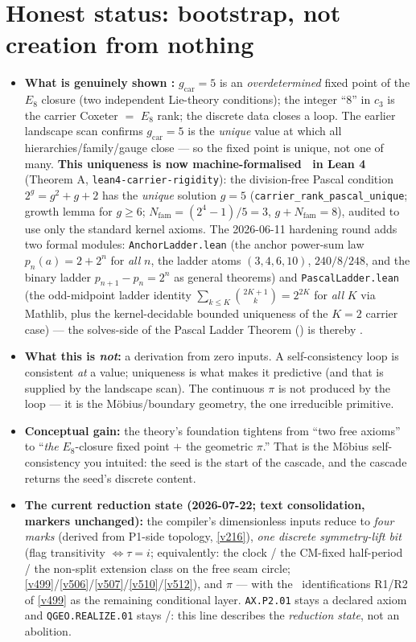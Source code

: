 \documentclass[11pt,a4paper]{article}
\newcommand{\gcar}{g_{\mathrm{car}}}
\newcommand{\Nfam}{N_{\mathrm{fam}}}
\newcommand{\cthree}{c_3}
\theoremstyle{definition}
\begin{document}
\section{Honest status: bootstrap, not creation from nothing}
\begin{itemize}[leftmargin=1.4em]
\item \textbf{What is genuinely shown \mE:} $\gcar=5$ is an \emph{overdetermined} fixed point of the
  $E_8$ closure (two independent Lie-theory conditions); the integer ``$8$'' in $\cthree$ is the carrier
  Coxeter $=$ $E_8$ rank; the discrete data closes a loop. The earlier landscape scan confirms
  $\gcar=5$ is the \emph{unique} value at which all hierarchies/family/gauge close --- so the fixed point
  is unique, not one of many. \textbf{This uniqueness is now machine-formalised \mE\ in Lean 4} (Theorem A,
  \texttt{lean4-carrier-rigidity}): the division-free Pascal condition $2^{g}=g^2+g+2$ has the \emph{unique}
  solution $g=5$ (\texttt{carrier\_rank\_pascal\_unique}; growth lemma for $g\ge6$; $\Nfam=(2^{4}{-}1)/5=3$,
  $g{+}\Nfam=8$), audited to use only the standard kernel axioms. The 2026-06-11 hardening round adds two
  formal modules: \texttt{AnchorLadder.lean} (the anchor power-sum law $p_n(a)=2+2^n$ for \emph{all} $n$,
  the ladder atoms $(3,4,6,10)$, $240/8/248$, and the binary ladder $p_{n+1}{-}p_n=2^n$ as general
  theorems) and \texttt{PascalLadder.lean} (the odd-midpoint ladder identity
  $\sum_{k\le K}\binom{2K+1}k=2^{2K}$ for \emph{all} $K$ via Mathlib, plus the kernel-decidable bounded
  uniqueness of the $K{=}2$ carrier case) --- the solves-side of the Pascal Ladder Theorem
  () is thereby \mE.
\item \textbf{What this is \emph{not}:} a derivation from zero inputs. A self-consistency loop is
  consistent \emph{at} a value; uniqueness is what makes it predictive (and that is supplied by the
  landscape scan). The continuous $\pi$ is not produced by the loop --- it is the Möbius/boundary
  geometry, the one irreducible primitive.
\item \textbf{Conceptual gain:} the theory's foundation tightens from ``two free axioms'' to ``\emph{the}
  $E_8$-closure fixed point $+$ the geometric $\pi$.'' That is the Möbius self-consistency you intuited:
  the seed is the start of the cascade, and the cascade returns the seed's discrete content.
\item \textbf{The current reduction state (2026-07-22; text consolidation, markers unchanged):} the
  compiler's dimensionless inputs reduce to \emph{four marks} (derived from P1-side topology,
  \vref{v216}), \emph{one discrete symmetry-lift bit} (flag transitivity $\iff\tau=i$; equivalently:
  the clock / the CM-fixed half-period / the non-split extension class on the free seam circle;
  \vref{v499}/\vref{v506}/\vref{v507}/\vref{v510}/\vref{v512}), and $\pi$ --- with the \mC\
  identifications R1/R2
  of \vref{v499} as the remaining conditional layer. \texttt{AX.P2.01} stays a declared axiom and
  \texttt{QGEO.REALIZE.01} stays \mC/\mO: this line describes the \emph{reduction state}, not an
  abolition.
\end{itemize}
\end{document}

